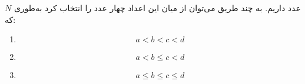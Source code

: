 \EXERCISE
$N$
عدد داریم. به چند طریق می‌توان از میان این اعداد چهار عدد را انتخاب کرد به‌طوری که:
\begin{enumerate}
\item
$$a < b < c < d$$
\item
$$a < b \leq c < d$$
\item
$$a \leq b \leq c \leq d$$
\end{enumerate}